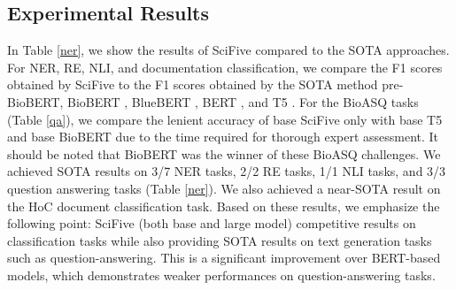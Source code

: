 \documentclass[nocrop]{bioinfo}
\begin{document}
\subsection{Experimental Results}
In Table \ref{ner}, we show the results of SciFive compared to the SOTA approaches. For NER, RE, NLI, and documentation classification, we compare the F1 scores obtained by SciFive to the F1 scores obtained by the SOTA method pre-BioBERT, BioBERT \cite{DBLP:journals/corr/abs-1901-08746}, BlueBERT \cite{DBLP:journals/corr/abs-1906-05474}, BERT \cite{DBLP:journals/corr/abs-1810-04805}, and T5 \cite{DBLP:journals/corr/abs-1910-10683}. For the BioASQ tasks (Table \ref{qa}), we compare the lenient accuracy of base SciFive only with base T5 and base BioBERT due to the time required for thorough expert assessment. It should be noted that BioBERT was the winner of these BioASQ challenges. We achieved SOTA results on 3/7 NER tasks, 2/2 RE tasks, 1/1 NLI tasks, and 3/3 question answering tasks (Table \ref{ner}). We also achieved a near-SOTA result on the HoC document classification task. Based on these results, we emphasize the following point: SciFive (both base and large model) competitive results on classification tasks while also providing SOTA results on text generation tasks such as question-answering. This is a significant improvement over BERT-based models, which demonstrates  weaker performances on question-answering tasks. 
\end{document}
